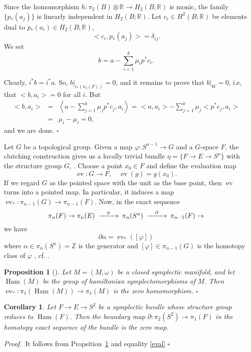 \documentclass[12pt, twoside]{amsart}
\theoremstyle{plain}
\newtheorem{prop}[theorem]{Proposition}
\newtheorem{cory}[theorem]{Corollary}
\theoremstyle{definition}
\numberwithin{equation}{section}
\def\RR{\mathbb R}
\def\ZZ{\mathbb Z}
\def\hqed{\hfill\hfill$\square$}
\def\ev{\operatorname {ev}}
\def\ham{\operatorname {Ham}}
\def\pa{\partial}
\def\ga{\alpha}
\def\gf{\varphi}
\def\RR{\mathbb R}
\def\ZZ{\mathbb Z}
\def\m{\medskip}
\def\p{{\it Proof.\ }}
\begin{document}
Since the homomorphism $h:\pi_2(B)\otimes \RR \to H_2(B;\RR)$ is monic, the 
family $\{p_*(a_j)\}$ is linearly independent in $H_2(B;\RR)$. Let $c_i\in 
H^2(B;\RR)$ be elements dual to $p_*(a_i)\in H_2(B;\RR)$,
$$
<c_i,p_*(a_j)>=\delta_{ij}.
$$
We set
$$
b=a-\sum_{i=1}^k \mu_i p^*c_i.
$$

Clearly, $i^*b=i^*a$. So, $b|_{i_*(\pi_2(F))}=0$, and it remains to prove 
that $b|_{W}=0$, i.e, that $<b,a_i>=0$ for all $i$. But
%
\begin{eqnarray*}
<b,a_i> &=&\left\langle a-\sum_{j=1}^k\mu_j p^*c_j,a_i\right\rangle 
=<a,a_i>-\sum_{j=1}^k\mu_j <p^*c_j,a_i>\\
&=&\mu_i-\mu_i=0,
\end{eqnarray*}
and we are done.
\hqed

\m Let $G$ be a topological group. Given a map $\gf: S^{n-1}\to G$ and a 
$G$-space $F$, the clutching construction gives us a locally trivial 
bundle $\eta=\{F \to E \to S^n\}$ with the structure group $G$, \cite{St}. 
Choose a point $x_0\in F$ and define the evaluation map
$$
\ev : G \to F, \quad \ev(g)=g(x_0).
$$
If we regard $G$ as the pointed space with the unit as the base point, then 
$\ev$ turns into a pointed map. In particular, it induces a map $\ev_*: 
\pi_{n-1}(G) \to \pi_{n-1}(F)$. Now, in the exact sequence
$$
\CD
\pi_n(F) \to \pi_n(E) @>p>> \pi_n(S^n) @>\pa>>\pi_{n-1}(F) \to
\endCD
$$
we have 
%
\begin{equation}\label{eval}
\pa\ga=\ev_*([\gf])
\end{equation}
%
where $\ga \in \pi_n(S^n)=\ZZ$ is the generator and $[\gf]\in \pi_{n-1}(G)$ is 
the homotopy class of $\gf$ , cf. \cite[\S 18]{St}.

\begin{prop} [{\cite[Section 1.2]{LMP}}]
\label{lmp}
Let $M=(M,\omega)$ be a closed symplectic manifold, and let $\ham(M)$ be the 
group of hamiltonian symplectomorphisms of $M$. Then $\ev_*: \pi_1(\ham(M)) 
\to 
\pi_1(M)$ is the zero homomorphism.
\hqed
\end{prop}

\begin{cory}\label{zero-map}
Let $F\to E\to S^2$ be a symplectic bundle whose structure group reduces to 
$\ham(F)$. Then the boundary map $\pa :\pi_2(S^2)\to \pi_1(F)$ in the homotopy 
exact sequence of the bundle is the zero map.  
\end{cory}

\p It follows from Propsition~\ref{lmp} and equality \eqref{eval}
\hqed
\end{document}
